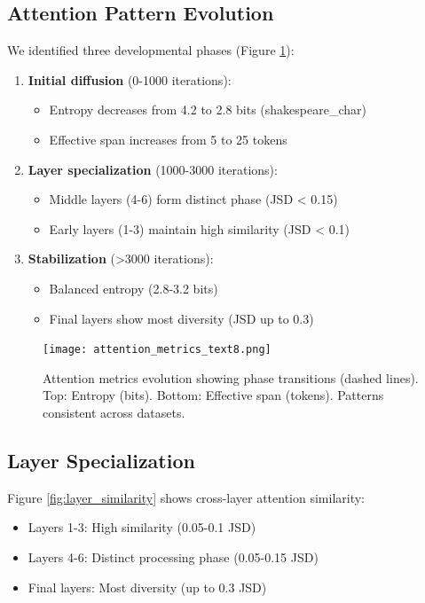 \documentclass{article} %
\begin{document}
\subsection{Attention Pattern Evolution}
We identified three developmental phases (Figure \ref{fig:attention_metrics}):

\begin{enumerate}
    \item \textbf{Initial diffusion} (0-1000 iterations):
    \begin{itemize}
        \item Entropy decreases from 4.2 to 2.8 bits (shakespeare\_char)
        \item Effective span increases from 5 to 25 tokens
    \end{itemize}
    
    \item \textbf{Layer specialization} (1000-3000 iterations):
    \begin{itemize}
        \item Middle layers (4-6) form distinct phase (JSD < 0.15)
        \item Early layers (1-3) maintain high similarity (JSD < 0.1)
    \end{itemize}
    
    \item \textbf{Stabilization} (>3000 iterations):
    \begin{itemize}
        \item Balanced entropy (2.8-3.2 bits)
        \item Final layers show most diversity (JSD up to 0.3)
    \end{itemize}
\end{enumerate}

\begin{figure}[h]
    \centering
    \texttt{[image: attention\_metrics\_text8.png]}
    \caption{Attention metrics evolution showing phase transitions (dashed lines). Top: Entropy (bits). Bottom: Effective span (tokens). Patterns consistent across datasets.}
    \label{fig:attention_metrics}
\end{figure}

\subsection{Layer Specialization}
Figure \ref{fig:layer_similarity} shows cross-layer attention similarity:

\begin{itemize}
    \item Layers 1-3: High similarity (0.05-0.1 JSD)
    \item Layers 4-6: Distinct processing phase (0.05-0.15 JSD)
    \item Final layers: Most diversity (up to 0.3 JSD)
\end{itemize}
\end{document}
